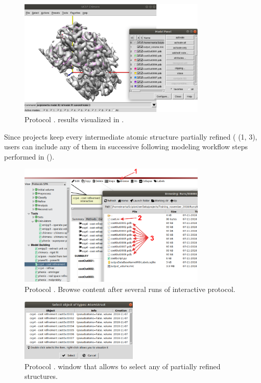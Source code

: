 \begin{itemize}
  \begin{figure}[H]
    \centering 
    \captionsetup{width=.7\linewidth} 
    \includegraphics[width=0.80\textwidth]{Images_appendix/Fig123.pdf}
    \caption{Protocol . \coot results visualized in \chimera.}
    \label{fig:app_protocol_coot_5}
   \end{figure}
   
  Since \scipion projects keep every intermediate atomic structure partially refined ( (1, 3), users can include any of them in successive following modeling workflow steps performed in \scipion ().
  
  \begin{figure}[H]
    \centering 
    \captionsetup{width=.7\linewidth}  
    \includegraphics[width=0.80\textwidth]{Images_appendix/Fig124.pdf}
    \caption{Protocol . Browse content after several runs of interactive \coot protocol.}
    \label{fig:app_protocol_coot_6}
   \end{figure}
   
   \begin{figure}[H]
    \centering 
    \captionsetup{width=.7\linewidth} 
    \includegraphics[width=0.50\textwidth]{Images_appendix/Fig125.pdf}
    \caption{Protocol . \scipion window that allows to select any of \coot partially refined structures.}
    \label{fig:app_protocol_coot_7}
   \end{figure}
   

\end{itemize}
